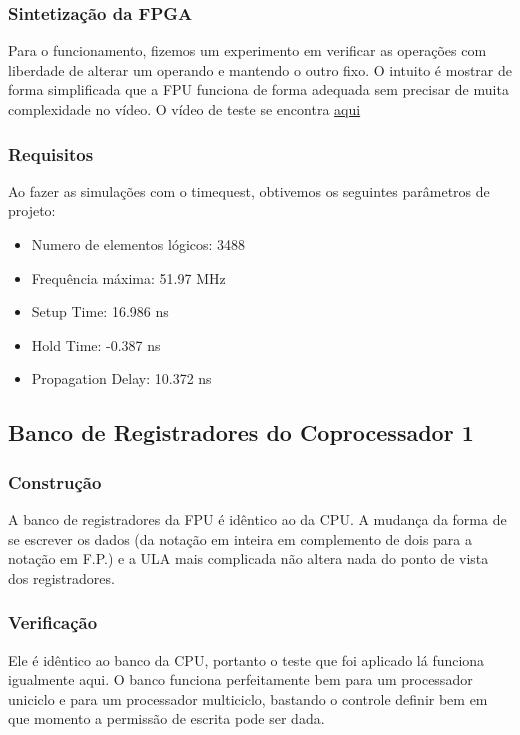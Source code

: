 	         \subsubsection{Sintetização da FPGA}
	         Para o funcionamento, fizemos um experimento em verificar as operações com liberdade de alterar um operando e mantendo o outro fixo. O intuito é mostrar de forma simplificada que a FPU funciona de forma adequada sem precisar de muita complexidade no vídeo.
	         O vídeo de teste se encontra \href{
https://www.youtube.com/watch?v=1_VCYLCTwAA&feature=youtu.be}{aqui}
	         
	         \subsubsection{Requisitos}
Ao fazer as simulações com o timequest, obtivemos os seguintes parâmetros de projeto:
	         \begin{itemize}
\item Numero de elementos lógicos: 3488
\item Frequência máxima: 51.97 MHz
\item Setup Time: 16.986 ns
\item Hold Time: -0.387 ns
\item Propagation Delay: 10.372 ns     
	         \end{itemize}

\subsection{Banco de Registradores do Coprocessador 1}

\subsubsection{Construção}
A banco de registradores da FPU é idêntico ao da CPU. A mudança da forma de se escrever os dados (da notação em inteira em complemento de dois para a notação em F.P.) e a ULA mais complicada não altera nada do ponto de vista dos registradores.

\subsubsection{Verificação}
Ele é idêntico ao banco da CPU, portanto o teste que foi aplicado lá funciona igualmente aqui. O banco funciona perfeitamente bem para um processador uniciclo e para um processador multiciclo, bastando o controle definir bem em que momento a permissão de escrita pode ser dada.

